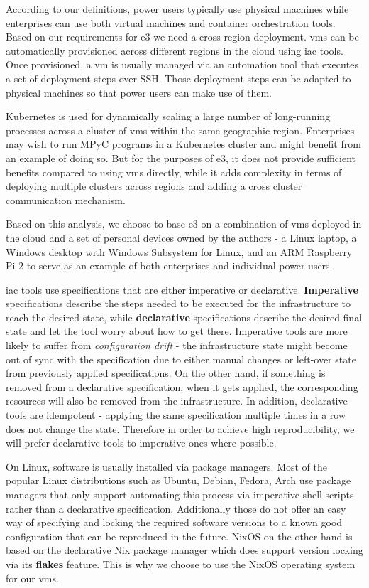 According to our definitions, power users typically use physical
machines while enterprises can use both virtual machines and container
orchestration tools. Based on our requirements for \gls{e3} we need a
cross region deployment. \glspl{vm} can be automatically provisioned
across different regions in the cloud using \gls{iac} tools. Once
provisioned, a \gls{vm} is usually managed via an automation tool that
executes a set of deployment steps over SSH. Those deployment steps can
be adapted to physical machines so that power users can make use of
them.

Kubernetes is used for dynamically scaling a large number of
long-running processes across a cluster of \glspl{vm} within the same
geographic region. Enterprises may wish to run MPyC programs in a
Kubernetes cluster and might benefit from an example of doing so. But
for the purposes of \gls{e3}, it does not provide sufficient benefits
compared to using \glspl{vm} directly, while it adds complexity in terms
of deploying multiple clusters across regions and adding a cross cluster
communication mechanism.

Based on this analysis, we choose to base \gls{e3} on a combination of
\glspl{vm} deployed in the cloud and a set of personal devices owned by
the authors - a Linux laptop, a Windows desktop with Windows Subsystem
for Linux, and an ARM Raspberry Pi 2 to serve as an example of both
enterprises and individual power users.

\gls{iac} tools use specifications that are either imperative or
declarative. \textbf{Imperative} specifications describe the steps
needed to be executed for the infrastructure to reach the desired state,
while \textbf{declarative} specifications describe the desired final
state and let the tool worry about how to get there. Imperative tools
are more likely to suffer from \emph{configuration drift} - the
infrastructure state might become out of sync with the specification due
to either manual changes or left-over state from previously applied
specifications. On the other hand, if something is removed from a
declarative specification, when it gets applied, the corresponding
resources will also be removed from the infrastructure. In addition,
declarative tools are idempotent - applying the same specification
multiple times in a row does not change the state. Therefore in order to
achieve high reproducibility, we will prefer declarative tools to
imperative ones where possible.

On Linux, software is usually installed via package managers. Most of
the popular Linux distributions such as Ubuntu, Debian, Fedora, Arch use
package managers that only support automating this process via
imperative shell scripts rather than a declarative specification.
Additionally those do not offer an easy way of specifying and locking
the required software versions to a known good configuration that can be
reproduced in the future. NixOS on the other hand is based on the
declarative Nix package manager which does support version locking via
its \textbf{flakes} feature. This is why we choose to use the NixOS
operating system for our \glspl{vm}.

